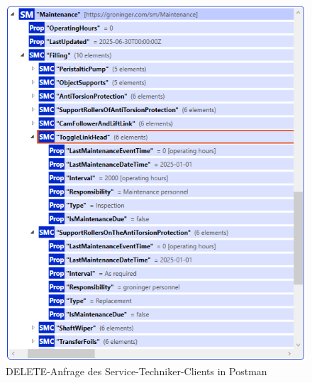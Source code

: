 \begin{figure}[htbp]
    \centering
        \includegraphics[width=1\textwidth]{Bilder/ErgebnissePackageExplorer/Wartung.PNG}
    \caption{DELETE-Anfrage des Service-Techniker-Clients in Postman}
    \label{fig:KeycloakAnmeldeSeite}
\end{figure}

